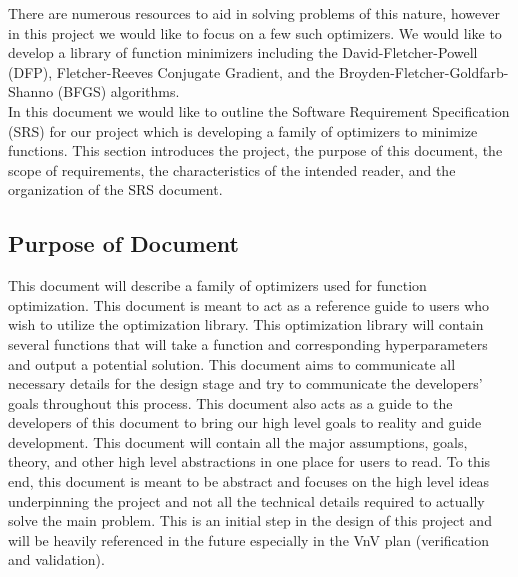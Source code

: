 \documentclass[12pt]{article}
\begin{document}
There are numerous resources to aid in solving problems of this nature, however in this project we would like to focus on a few such optimizers. We would like to develop a library of function minimizers including the David-Fletcher-Powell (DFP), Fletcher-Reeves Conjugate Gradient, and the Broyden-Fletcher-Goldfarb-Shanno (BFGS) algorithms. 
\\

In this document we would like to outline the Software Requirement Specification (SRS) for our project which is developing a family of optimizers to minimize functions. This section introduces the project, the purpose of this document, the scope of requirements, the characteristics of the intended reader, and the organization of the SRS document.


\subsection{Purpose of Document}

This document will describe a family of optimizers used for function optimization. This document is meant to act as a reference guide to users who wish to utilize the optimization library. This optimization library will contain several functions that will take a function and corresponding hyperparameters and output a potential solution. This document aims to communicate all necessary details for the design stage and try to communicate the developers' goals throughout this process. This document also acts as a guide to the developers of this document to bring our high level goals to reality and guide development. This document will contain all the major assumptions, goals, theory, and other high level abstractions in one place for users to read. To this end, this document is meant to be abstract and focuses on the high level ideas underpinning the project and not all the technical details required to actually solve the main problem. This is an initial step in the design of this project and will be heavily referenced in the future especially in the VnV plan (verification and validation).

  
\end{document}
